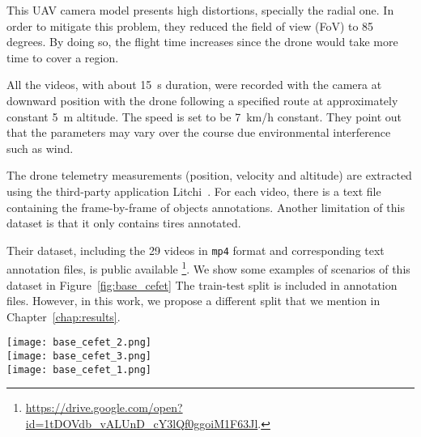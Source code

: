 This UAV camera model presents high distortions, specially the radial one.
In order to mitigate this problem, they reduced the field of view (FoV) to 85 degrees.
By doing so, the flight time increases since the drone would take more time to cover a region.

All the videos, with about 15~s duration, were recorded with the camera at downward position with the drone following a specified route at
approximately constant 5~m altitude.
The speed is set to be 7~km/h constant.
They point out that the parameters may vary over the course due environmental interference such as wind.

The drone telemetry measurements (\eg position, velocity and altitude) are extracted using the third-party application Litchi~\cite{web:litchi}.
For each video, there is a text file containing the frame-by-frame of objects annotations.
Another limitation of this dataset is that it only contains tires annotated.

Their dataset, including the 29 videos in \verb|mp4| format and corresponding text annotation files, is public available
\footnote{\url{https://drive.google.com/open?id=1tDOVdb_vALUnD_cY3lQf0ggoiM1F63Jl}.}.
We show some examples of scenarios of this dataset in Figure~\ref{fig:base_cefet}
The train-test split is included in annotation files.
However, in this work, we propose a different split that we mention in Chapter~\ref{chap:results}.

\begin{figure*}[htb!]
	\centering
	\texttt{[image: base\_cefet\_2.png]}\\
	\vspace{2mm}
	\texttt{[image: base\_cefet\_3.png]}\\
	\vspace{2mm}
	\texttt{[image: base\_cefet\_1.png]}\\
	\caption{Examples of scenarios contemplated by the CEFET dataset.}
	\label{fig:base_cefet}
\end{figure*}


